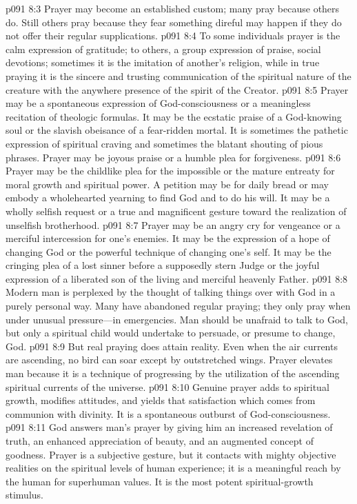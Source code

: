 \pc \vs p091 8:3 Prayer may become an established custom; many pray because others do. Still others pray because they fear something direful may happen if they do not offer their regular supplications.
\vs p091 8:4 To some individuals prayer is the calm expression of gratitude; to others, a group expression of praise, social devotions; sometimes it is the imitation of another’s religion, while in true praying it is the sincere and trusting communication of the spiritual nature of the creature with the anywhere presence of the spirit of the Creator.
\vs p091 8:5 Prayer may be a spontaneous expression of God\hyp{}consciousness or a meaningless recitation of theologic formulas. It may be the ecstatic praise of a God\hyp{}knowing soul or the slavish obeisance of a fear\hyp{}ridden mortal. It is sometimes the pathetic expression of spiritual craving and sometimes the blatant shouting of pious phrases. Prayer may be joyous praise or a humble plea for forgiveness.
\vs p091 8:6 Prayer may be the childlike plea for the impossible or the mature entreaty for moral growth and spiritual power. A petition may be for daily bread or may embody a wholehearted yearning to find God and to do his will. It may be a wholly selfish request or a true and magnificent gesture toward the realization of unselfish brotherhood.
\vs p091 8:7 Prayer may be an angry cry for vengeance or a merciful intercession for one’s enemies. It may be the expression of a hope of changing God or the powerful technique of changing one’s self. It may be the cringing plea of a lost sinner before a supposedly stern Judge or the joyful expression of a liberated son of the living and merciful heavenly Father.\plusone
\pc \vs p091 8:8 Modern man is perplexed by the thought of talking things over with God in a purely personal way. Many have abandoned regular praying; they only pray when under unusual pressure---in emergencies. Man should be unafraid to talk to God, but only a spiritual child would undertake to persuade, or presume to change, God.
\pc \vs p091 8:9 But real praying does attain reality. Even when the air currents are ascending, no bird can soar except by outstretched wings. Prayer elevates man because it is a technique of progressing by the utilization of the ascending spiritual currents of the universe.
\vs p091 8:10 Genuine prayer adds to spiritual growth, modifies attitudes, and yields that satisfaction which comes from communion with divinity. It is a spontaneous outburst of God\hyp{}consciousness.
\vs p091 8:11 God answers man’s prayer by giving him an increased revelation of truth, an enhanced appreciation of beauty, and an augmented concept of goodness. Prayer is a subjective gesture, but it contacts with mighty objective realities on the spiritual levels of human experience; it is a meaningful reach by the human for superhuman values. It is the most potent spiritual\hyp{}growth stimulus.
